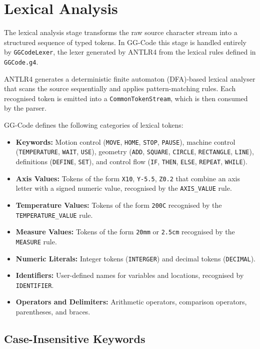 \section{Lexical Analysis}

The lexical analysis stage transforms the raw source character stream into a structured sequence of typed tokens. In GG-Code this stage is handled entirely by \texttt{GGCodeLexer}, the lexer generated by ANTLR4 from the lexical rules defined in \texttt{GGCode.g4}.

ANTLR4 generates a deterministic finite automaton (DFA)-based lexical analyser that scans the source sequentially and applies pattern-matching rules. Each recognised token is emitted into a \texttt{CommonTokenStream}, which is then consumed by the parser.

GG-Code defines the following categories of lexical tokens:

\begin{itemize}
    \item[-] \textbf{Keywords:} Motion control (\texttt{MOVE}, \texttt{HOME}, \texttt{STOP}, \texttt{PAUSE}), machine control (\texttt{TEMPERATURE}, \texttt{WAIT}, \texttt{USE}), geometry (\texttt{ADD}, \texttt{SQUARE}, \texttt{CIRCLE}, \texttt{RECTANGLE}, \texttt{LINE}), definitions (\texttt{DEFINE}, \texttt{SET}), and control flow (\texttt{IF}, \texttt{THEN}, \texttt{ELSE}, \texttt{REPEAT}, \texttt{WHILE}).
    \item[-] \textbf{Axis Values:} Tokens of the form \texttt{X10}, \texttt{Y-5.5}, \texttt{Z0.2} that combine an axis letter with a signed numeric value, recognised by the \texttt{AXIS\_VALUE} rule.
    \item[-] \textbf{Temperature Values:} Tokens of the form \texttt{200C} recognised by the \texttt{TEMPERATURE\_VALUE} rule.
    \item[-] \textbf{Measure Values:} Tokens of the form \texttt{20mm} or \texttt{2.5cm} recognised by the \texttt{MEASURE} rule.
    \item[-] \textbf{Numeric Literals:} Integer tokens (\texttt{INTERGER}) and decimal tokens (\texttt{DECIMAL}).
    \item[-] \textbf{Identifiers:} User-defined names for variables and locations, recognised by \texttt{IDENTIFIER}.
    \item[-] \textbf{Operators and Delimiters:} Arithmetic operators, comparison operators, parentheses, and braces.
\end{itemize}

\subsection*{Case-Insensitive Keywords}

